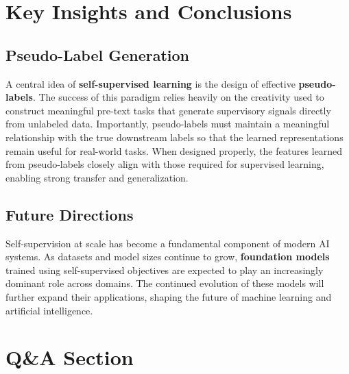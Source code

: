 \documentclass{article}
\begin{document}
\section{Key Insights and Conclusions}

\subsection{Pseudo-Label Generation}

A central idea of \textbf{self-supervised learning} is the design of effective \textbf{pseudo-labels}. The success of this paradigm relies heavily on the creativity used to construct meaningful pre-text tasks that generate supervisory signals directly from unlabeled data. Importantly, pseudo-labels must maintain a meaningful relationship with the true downstream labels so that the learned representations remain useful for real-world tasks. When designed properly, the features learned from pseudo-labels closely align with those required for supervised learning, enabling strong transfer and generalization.

\subsection{Future Directions}

Self-supervision at scale has become a fundamental component of modern AI systems. As datasets and model sizes continue to grow, \textbf{foundation models} trained using self-supervised objectives are expected to play an increasingly dominant role across domains. The continued evolution of these models will further expand their applications, shaping the future of machine learning and artificial intelligence.

\section{Q\&A Section}
\end{document}
